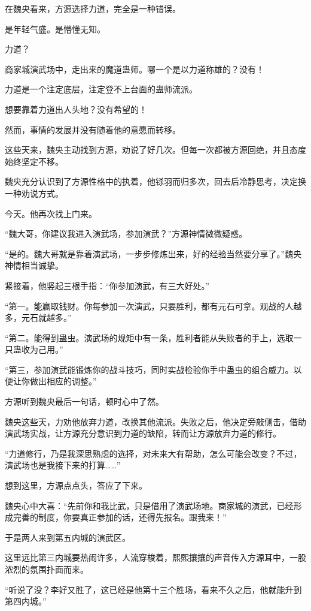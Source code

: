 \begin{this_body}
在魏央看来，方源选择力道，完全是一种错误。

是年轻气盛。是懵懂无知。

力道？

商家城演武场中，走出来的魔道蛊师。哪一个是以力道称雄的？没有！

力道是一个注定底层，注定登不上台面的蛊师流派。

想要靠着力道出人头地？没有希望的！

然而，事情的发展并没有随着他的意愿而转移。

这些天来，魏央主动找到方源，劝说了好几次。但每一次都被方源回绝，并且态度始终坚定不移。

魏央充分认识到了方源性格中的执着，他铩羽而归多次，回去后冷静思考，决定换一种劝说方式。

今天。他再次找上门来。

“魏大哥，你建议我进入演武场，参加演武？”方源神情微微疑惑。

“是的。魏大哥就是靠着演武场，一步步修炼出来，好的经验当然要分享了。”魏央神情相当诚挚。

紧接着，他竖起三根手指：“你参加演武，有三大好处。”

“第一。能赢取钱财。你每参加一次演武，只要胜利，都有元石可拿。观战的人越多，元石就越多。”

“第二。能得到蛊虫。演武场的规矩中有一条，胜利者能从失败者的手上，选取一只蛊收为己用。”

“第三，参加演武能锻炼你的战斗技巧，同时实战检验你手中蛊虫的组合威力。以便让你做出相应的调整。”

方源听到魏央最后一句话，顿时心中了然。

魏央这些天，力劝他放弃力道，改换其他流派。失败之后，他决定旁敲侧击，借助演武场实战，让方源充分意识到力道的缺陷，转而让方源放弃力道的修行。

“力道修行，乃是我深思熟虑的选择，对未来大有帮助，怎么可能会改变？不过，演武场也是我接下来的打算……”

想到这里，方源点点头，答应了下来。

魏央心中大喜：“先前你和我比武，只是借用了演武场地。商家城的演武，已经形成完善的制度，你要真正参加的话，还得先报名。跟我来！”

于是两人来到第五内城的演武区。

这里远比第三内城要热闹许多，人流穿梭着，熙熙攘攘的声音传入方源耳中，一股浓烈的氛围扑面而来。

“听说了没？李好又胜了，这已经是他第十三个胜场，看来不久之后，他就能升到第四内城。”


\end{this_body}
